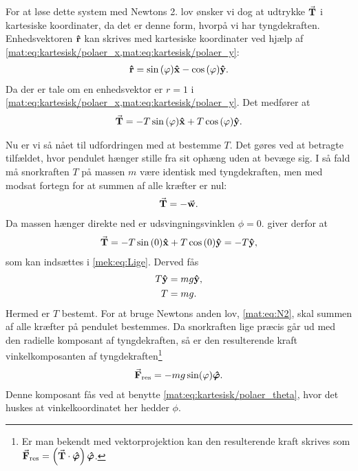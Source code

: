 \begin{example}
For at løse dette system med Newtons 2. lov ønsker vi dog at udtrykke $\va{T}$ i kartesiske koordinater, da det er denne form, hvorpå vi har tyngdekraften. Enhedsvektoren $\vu{r}$ kan skrives med kartesiske koordinater ved hjælp af \cref{mat:eq:kartesisk/polaer_x,mat:eq:kartesisk/polaer_y}:
%
\begin{align}
    \vu{r} = \sin{(\varphi)} \vu{x} - \cos{(\varphi)} \vu{y}.
\end{align}
%
Da der er tale om en enhedsvektor er $r = 1$ i \cref{mat:eq:kartesisk/polaer_x,mat:eq:kartesisk/polaer_y}. Det medfører at
%
\begin{align} \label{mek:eq:snor_kart_basis}
    \va{T} = -T\sin{(\varphi)} \vu{x} + T\cos{(\varphi)} \vu{y}. 
\end{align}

Nu er vi så nået til udfordringen med at bestemme $T$. Det gøres ved at betragte tilfældet, hvor pendulet hænger stille fra sit ophæng uden at bevæge sig. I så fald må snorkraften $T$ på massen $m$ være identisk med tyngdekraften, men med modsat fortegn for at summen af alle kræfter er nul:
%
\begin{align}\label{mek:eq:Lige}
    \va{T} = -\va{w}. 
\end{align}
%
Da massen hænger direkte ned er udsvingningsvinklen $\phi = 0$.  giver derfor at
%
\begin{align}
    \va{T} = -T\sin{(0)} \vu{x} + T\cos{(0)} \vu{y} = -T\vu{y},
\end{align}
%
som kan indsættes i \cref{mek:eq:Lige}. Derved fås
%
\begin{align}
\begin{aligned}
    T\vu{y} &= mg\vu{y}, \\
    T &= mg.
\end{aligned}
\end{align}
%
Hermed er $T$ bestemt. For at bruge Newtons anden lov, \cref{mat:eq:N2}, skal summen af alle kræfter på pendulet bestemmes. Da snorkraften lige præcis går ud med den radielle komposant af tyngdekraften, så er den resulterende kraft vinkelkomposanten af tyngdekraften\footnote{Er man bekendt med vektorprojektion kan den resulterende kraft skrives som $\va{F}_\textup{res} = \left( \va{T}\cdot \vu*{\varphi} \right) \vu*{\varphi}$.}
%
\begin{align} \label{mek:eq:pendul_res_kraft}
    \va{F}_\textup{res} = -mg\sin(\varphi)\vu*{\varphi}.
\end{align}
%
Denne komposant fås ved at benytte \cref{mat:eq:kartesisk/polaer_theta}, hvor det huskes at vinkelkoordinatet her hedder $\phi$.


\end{example}
